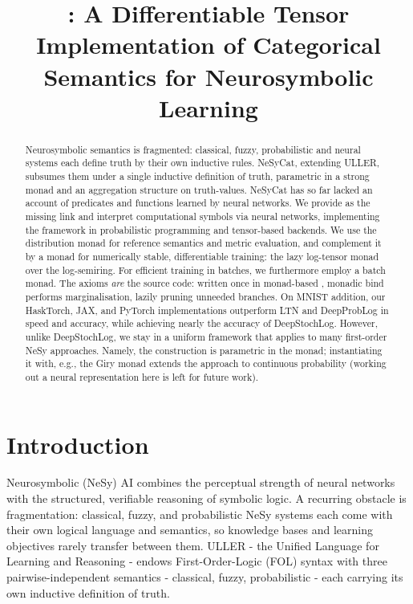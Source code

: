 \documentclass[anon]{../../journal-templates/NeSy26/nesy2026} %
\title[\nesycattorch]{\nesycattorch: A Differentiable Tensor Implementation of Categorical Semantics for Neurosymbolic Learning}
\begin{document}
\maketitle

\begin{abstract}
Neurosymbolic semantics is fragmented: classical, fuzzy, probabilistic and neural systems each define truth by their own inductive rules. NeSyCat, extending ULLER, subsumes them under a single inductive definition of truth, parametric in a strong monad and an aggregation structure on truth-values. NeSyCat has so far lacked an account of predicates and functions learned by neural networks. We provide \nesycattorch as the missing link and interpret computational symbols via neural networks, implementing the framework in probabilistic programming and tensor-based backends. We use the distribution monad for reference semantics and metric evaluation, and complement it by a monad for numerically stable, differentiable training: the lazy log-tensor monad over the log-semiring. For efficient training in batches, we furthermore employ a batch monad. The axioms \emph{are} the source code: written once in monad-based \doNotation, monadic bind performs marginalisation, lazily pruning unneeded branches. On MNIST addition, our HaskTorch, JAX, and PyTorch implementations outperform LTN and DeepProbLog in speed and accuracy, while achieving nearly the accuracy of DeepStochLog. However, unlike DeepStochLog, we stay in a uniform framework that applies to many first-order NeSy approaches. Namely,
the construction is parametric in the monad; instantiating it with, e.g., the Giry monad extends the approach to continuous probability (working out a neural representation here is left for future work).
\end{abstract}


\section{Introduction}
\label{sec:intro}

Neurosymbolic (NeSy) AI combines the perceptual strength of neural networks with the structured,
verifiable reasoning of symbolic logic. A recurring obstacle is fragmentation: classical, fuzzy,
and probabilistic NeSy systems each come with their own logical language and semantics, so knowledge
bases and learning objectives rarely transfer between them. ULLER - the Unified Language for Learning
and Reasoning \citep{vankriekenULLER2024} -  endows First-Order-Logic (FOL) syntax with three pairwise-independent
semantics - classical, fuzzy, probabilistic - each carrying its own inductive definition of truth.
\end{document}
